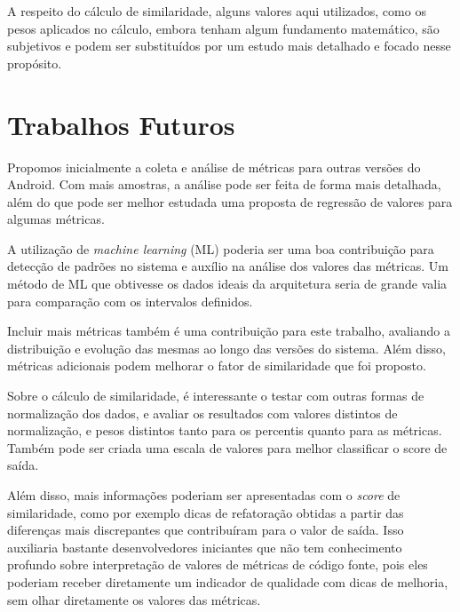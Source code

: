 A respeito do cálculo de similaridade, alguns valores aqui utilizados, como os pesos aplicados no cálculo, embora tenham algum fundamento matemático, são subjetivos e podem ser substituídos por um estudo mais detalhado e focado nesse propósito.

\section{Trabalhos Futuros}

Propomos inicialmente a coleta e análise de métricas para outras versões do Android. Com mais amostras, a análise pode ser feita de forma mais detalhada, além do que pode ser melhor estudada uma proposta de regressão de valores para algumas métricas.

A utilização de \textit{machine learning} (ML) poderia ser uma boa contribuição para detecção de padrões no sistema e auxílio na análise dos valores das métricas. Um método de ML que obtivesse os dados ideais da arquitetura seria de grande valia para comparação com os intervalos definidos.

Incluir mais métricas também é uma contribuição para este trabalho, avaliando a distribuição e evolução das mesmas ao longo das versões do sistema. Além disso, métricas adicionais podem melhorar o fator de similaridade que foi proposto.

Sobre o cálculo de similaridade, é interessante o testar com outras formas de normalização dos dados, e avaliar os resultados com valores distintos de normalização, e pesos distintos tanto para os percentis quanto para as métricas. Também pode ser criada uma escala de valores para melhor classificar o score de saída.

Além disso, mais informações poderiam ser apresentadas com o \textit{score} de similaridade, como por exemplo dicas de refatoração obtidas a partir das diferenças mais discrepantes que contribuíram para o valor de saída. Isso auxiliaria bastante desenvolvedores iniciantes que não tem conhecimento profundo sobre interpretação de valores de métricas de código fonte, pois eles poderiam receber diretamente um indicador de qualidade com dicas de melhoria, sem olhar diretamente os valores das métricas.